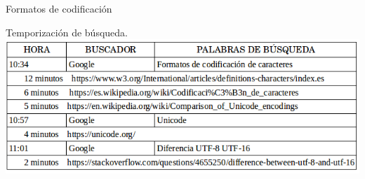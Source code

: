\begin{section}{Formatos de codificaci\'on}
		\begin{subsection}{Temporizaci\'on de b\'usqueda.}
			\includegraphics[width=1\textwidth]{codificacion_tiempos.png}
		\end{subsection}
		
	\end{section}
	
	\newpage
	
